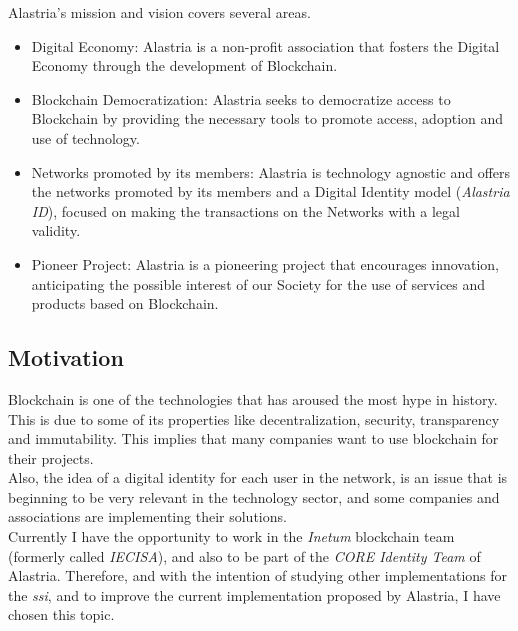 \documentclass[a4paper, 12pt]{article} %
\begin{document}
        Alastria's mission and vision covers several areas.
        \begin{itemize}
            \item Digital Economy: Alastria is a non-profit association that fosters the Digital Economy through the development of Blockchain.
            \item Blockchain Democratization: Alastria seeks to democratize access to Blockchain by providing the necessary tools to promote access, adoption and use of technology.
            \item Networks promoted by its members: Alastria is technology agnostic and offers the networks promoted by its members and a Digital Identity model (\textit{Alastria ID}), focused on making the transactions on the Networks with a legal validity. 
            \item Pioneer Project: Alastria is a pioneering project that encourages innovation, anticipating the possible interest of our Society for the use of services and products based on Blockchain.
        \end{itemize}
        
        \subsection{Motivation}
            Blockchain is one of the technologies that has aroused the most hype in history. This is due to some of its properties like decentralization, security, transparency and immutability. This implies that many companies want to use blockchain for their projects.\\
            
            Also, the idea of a digital identity for each user in the network, is an issue that is beginning to be very relevant in the technology sector, and some companies and associations are implementing their solutions.\\
            
            
            Currently I have the opportunity to work in the \textit{Inetum} blockchain team (formerly called \textit{IECISA}), and also to be part of the \textit{CORE Identity Team} of Alastria. Therefore, and with the intention of studying other implementations for the \textit{\acrshort{ssi}}, and to improve the current implementation proposed by Alastria, I have chosen this topic.
            
\end{document}
